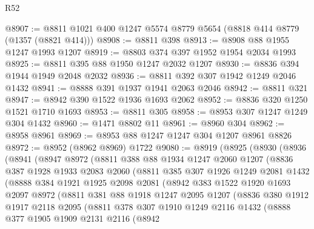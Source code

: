 \begin{lexlean}{R52}
\begin{coremodule}
@8907 := @8811 @1021 @400 @1247 @5574 @8779 @5654 (@8818 @414 @8779 (@1357 (@8821 @414)))
@8908 := @8811 @398
@8913 := @8908 @88 @1955 @1247 @1993 @1207
@8919 := @8803 @374 @397 @1952 @1954 @2034 @1993
@8925 := @8811 @395 @88 @1950 @1247 @2032 @1207
@8930 := @8836 @394 @1944 @1949 @2048 @2032
@8936 := @8811 @392 @307 @1942 @1249 @2046 @1432
@8941 := @8888 @391 @1937 @1941 @2063 @2046
@8942 := @8811 @321
@8947 := @8942 @390 @1522 @1936 @1693 @2062
@8952 := @8836 @320 @1250 @1521 @1710 @1693
@8953 := @8811 @305
@8958 := @8953 @307 @1247 @1249 @304 @1432
@8960 := @1471 @8802 @11
@8961 := @8960 @304
@8962 := @8958 @8961
@8969 := @8953 @88 @1247 @1247 @304 @1207 @8961 @8826
@8972 := @8952 (@8962 @8969) @1722
@9080 := @8919
    (@8925
      (@8930
        (@8936
          (@8941
            (@8947
              @8972
              (@8811
                @388
                @88
                @1934
                @1247
                @2060
                @1207
                (@8836
                  @387
                  @1928
                  @1933
                  @2083
                  @2060
                  (@8811
                    @385
                    @307
                    @1926
                    @1249
                    @2081
                    @1432
                    (@8888
                      @384
                      @1921
                      @1925
                      @2098
                      @2081
                      (@8942
                        @383
                        @1522
                        @1920
                        @1693
                        @2097
                        @8972
                        (@8811
                          @381
                          @88
                          @1918
                          @1247
                          @2095
                          @1207
                          (@8836
                            @380
                            @1912
                            @1917
                            @2118
                            @2095
                            (@8811
                              @378
                              @307
                              @1910
                              @1249
                              @2116
                              @1432
                              (@8888
                                @377
                                @1905
                                @1909
                                @2131
                                @2116
                                (@8942

\end{coremodule}
\end{lexlean}
